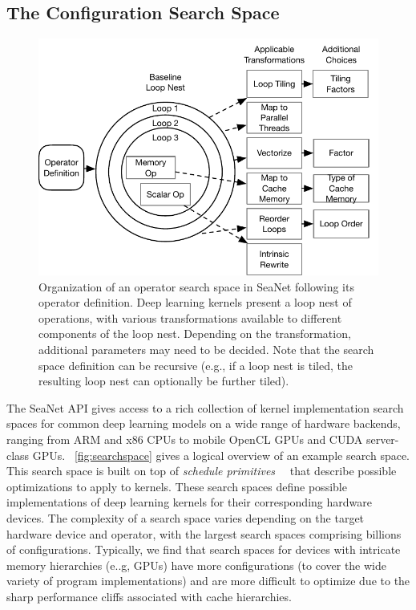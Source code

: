 \subsection{The Configuration Search Space}
\label{sec:searchspace}
\begin{figure}[tb]
    \centering
    \includegraphics[width=\textwidth]{sys_diagrams/searchspace.pdf}
    \caption{Organization of an operator search space in SeaNet following its operator definition. Deep learning kernels present a loop nest of operations, with various transformations available to different components of the loop nest. Depending on the transformation, additional parameters may need to be decided. Note that the search space definition can be recursive (e.g., if a loop nest is tiled, the resulting loop nest can optionally be further tiled).}
    \label{fig:searchspace}
\end{figure}
The SeaNet API gives access to a rich collection of kernel implementation search spaces for common deep learning models on a wide range of hardware backends, ranging from ARM and x86 CPUs to mobile OpenCL GPUs and CUDA server-class GPUs.
~\autoref{fig:searchspace} gives a logical overview of an example search space.
This search space is built on top of \emph{schedule primitives}~\cite{ragan2017halide}~\cite{222575} that describe possible optimizations to apply to kernels.
These search spaces define possible implementations of deep learning kernels for their corresponding hardware devices.
The complexity of a search space varies depending on the target hardware device and operator, with the largest search spaces comprising billions of configurations.
Typically, we find that search spaces for devices with intricate memory hierarchies (e..g, GPUs) have more configurations (to cover the wide variety of program implementations) and are more difficult to optimize due to the sharp performance cliffs associated with cache hierarchies.


